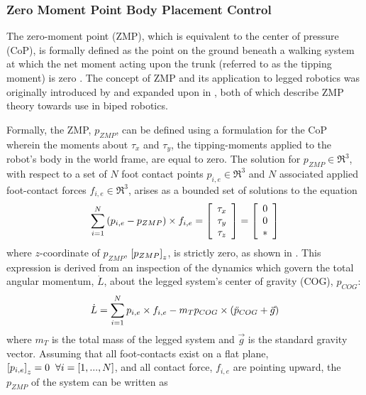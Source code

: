 		\subsubsection{Zero Moment Point Body Placement Control}

		The zero-moment point (ZMP), which is equivalent to the center of pressure (CoP), is formally defined as the point on the ground beneath a walking system at which the net moment acting upon the trunk (referred to as the tipping moment) is zero \cite{Sardain2004}. The concept of ZMP and its application to legged robotics was originally introduced by \cite{Vuko1972} and expanded upon in \cite{Goswami1999}, both of which describe ZMP theory towards use in biped robotics.

		Formally, the ZMP, $p_{ZMP}$, can be defined using a formulation for the CoP wherein the moments about $\tau_{x}$ and $\tau_{y}$, the tipping-moments applied to the robot's body in the world frame, are equal to zero. The solution for $p_{ZMP}\in\Re^{3}$, with respect to a set of $N$ foot contact points $p_{i,e}\in\Re^{3}$ and $N$ associated applied foot-contact forces $f_{i,e}\in\Re^{3}$, arises as a bounded set of solutions to the equation
			\begin{equation}
				\sum^{N}_{i=1}\left(p_{i,e}-p_{ZMP}\right)\times f_{i,e} 
				= 
				\left[
					\begin{array}{c}
						\tau_{x}	\\
						\tau_{y}	\\
						\tau_{z}
					\end{array}
				\right]
				=
				\left[
					\begin{array}{c}
						0			\\
						0			\\
						*
					\end{array}
				\right]
			\end{equation}
		where $z$-coordinate of $p_{ZMP}$, $\left[p_{ZMP}\right]_{z}$, is strictly zero, as shown in \cite{Wieber2015}. This expression is derived from an inspection of the dynamics which govern the total angular momentum, $\dot{L}$, about the legged system's center of gravity (COG), $p_{COG}$:
			\begin{equation}
				\dot{L} = \sum_{i=1}^{N} p_{i,e}\times f_{i,e} - m_{T} p_{COG} \times \left( \ddot{p}_{COG} + \vec{g} \right)
			\end{equation}
		where $m_{T}$ is the total mass of the legged system and $\vec{g}$ is the standard gravity vector. Assuming that all foot-contacts exist on a flat plane, \IE $\left[p_{i,e}\right]_{z}=0\hspace{2mm} \forall i=[1,...,N]$, and all contact force, $f_{i,e}$ are pointing upward, the $p_{ZMP}$ of the system can be written as
